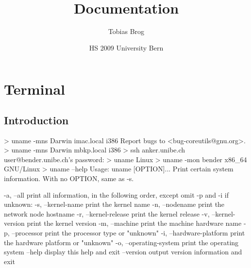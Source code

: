 \documentclass[10pt,a4paper]{scrartcl}
\date{HS 2009 University Bern}
\author{Tobias Brog}
\title{Documentation}
\begin{document}
\maketitle
\section{Terminal}
\subsection{Introduction}
\begin{terminalcode}
> uname -mns
  Darwin imac.local i386
  Report bugs to <bug-coreutils@gnu.org>.
> uname -mns
  Darwin mbkp.local i386
> ssh anker.unibe.ch
  user@bender.unibe.ch's password: 
> uname
  Linux
> uname -mon
  bender x86_64 GNU/Linux
> uname --help
  Usage: uname [OPTION]...
  Print certain system information.  With no OPTION, same as -s.
  
    -a, --all                print all information, in the following order,
                               except omit -p and -i if unknown:
    -s, --kernel-name        print the kernel name
    -n, --nodename           print the network node hostname
    -r, --kernel-release     print the kernel release
    -v, --kernel-version     print the kernel version
    -m, --machine            print the machine hardware name
    -p, --processor          print the processor type or "unknown"
    -i, --hardware-platform  print the hardware platform or "unknown"
    -o, --operating-system   print the operating system
        --help     display this help and exit
        --version  output version information and exit
\end{terminalcode}

\end{document}
